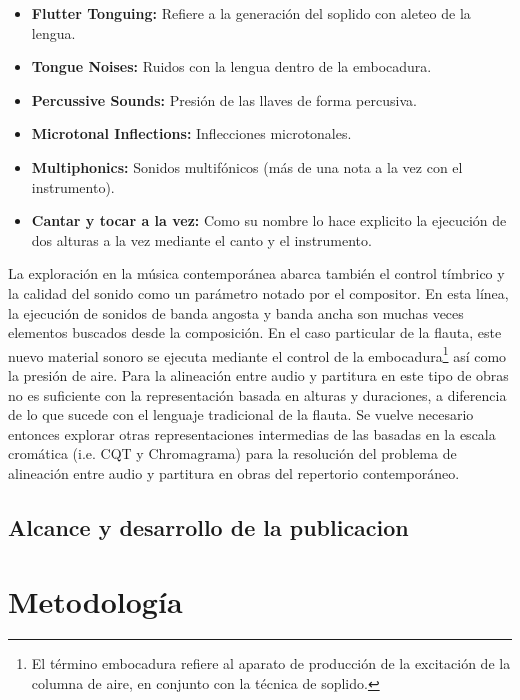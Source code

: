 \documentclass
  [ams,pdfout]%
	{aeslac}
\begin{document}
\begin{itemize}

\item \textbf{Flutter Tonguing:} Refiere a la generación del soplido con aleteo de la lengua. 
\item \textbf{Tongue Noises:} Ruidos con la lengua dentro de la embocadura. 
\item \textbf{Percussive Sounds:} Presión de las llaves de forma percusiva.
\item \textbf{Microtonal Inflections:} Inflecciones microtonales.
\item \textbf{Multiphonics:} Sonidos multifónicos (más de una nota a la vez con el instrumento).
\item \textbf{Cantar y tocar a la vez:} Como su nombre lo hace explicito la ejecución de dos alturas a la vez mediante el canto y el instrumento.

\end{itemize}

%
La exploración en la música contemporánea abarca también el control tímbrico y la calidad del sonido como un parámetro notado por el compositor. En esta línea, la ejecución de sonidos de banda angosta y banda ancha son muchas veces elementos buscados desde la composición. En el caso particular de la flauta, este nuevo material sonoro se ejecuta mediante el control de la embocadura\footnote{El término embocadura refiere al aparato de producción de la excitación de la columna de aire, en conjunto con la técnica de soplido.} así como la presión de aire. Para la alineación entre audio y partitura en este tipo de obras no es suficiente con la representación basada en alturas y duraciones, a diferencia de lo que sucede con el lenguaje tradicional de la flauta. Se vuelve necesario entonces explorar otras representaciones intermedias de las basadas en la escala cromática (i.e. CQT y Chromagrama) para la resolución del problema de alineación entre audio y partitura en obras del repertorio contemporáneo.      

\subsection{Alcance y desarrollo de la publicacion}
%

%



\section{Metodología}
\end{document}
